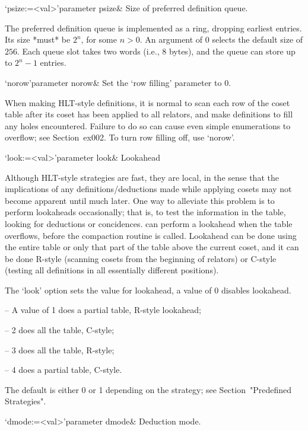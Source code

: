 \>`psize:=<val>'{parameter psize}&
Size of preferred definition queue.

The  preferred definition  queue is  implemented as  a  ring, dropping
earliest  entries.  Its  size *must*  be  $2^n$, for  some $n>0$.   An
argument  of 0 selects  the default  size of  $256$.  Each  queue slot
takes two words (i.e., 8 bytes), and the queue can store up to $2^n-1$
entries.

\>`norow'{parameter norow}&
Set the `row filling' parameter to 0.

When making HLT-style definitions, it is normal to scan each row of the
coset table after its coset has been applied to all relators, and make 
definitions to fill any holes encountered.
Failure to do so can cause even simple enumerations to overflow; see
Section~{ex002}.
To turn row filling off, use `norow'.

\>`look:=<val>'{parameter look}&
Lookahead
  
Although HLT-style strategies  are fast, they are local,  in the sense
that  the  implications   of  any  definitions/deductions  made  while
applying cosets may not become  apparent until much later.  One way to
alleviate this problem is to perform lookaheads occasionally; that is,
to  test the  information  in  the table,  looking  for deductions  or
concidences.  {\ACE} can perform a lookahead when the table overflows,
before the compaction routine is  called.  Lookahead can be done using
the entire  table or  only that  part of the  table above  the current
coset, and it can be  done R-style (scanning cosets from the beginning
of relators)  or C-style (testing  all definitions in  all essentially
different positions).

The `look' option sets the value for lookahead, a value of 0 disables
lookahead.

\beginitems

\item{--} A value of 1 does a partial table, R-style lookahead; 
\item{--} 2 does all the table, C-style; 
\item{--} 3 does all the table, R-style; 
\item{--} 4 does a partial table, C-style.  

\enditems

The  default  is  either  0  or  1  depending  on  the  strategy;  see
Section~"Predefined Strategies".


\>`dmode:=<val>'{parameter dmode}&
Deduction mode.

